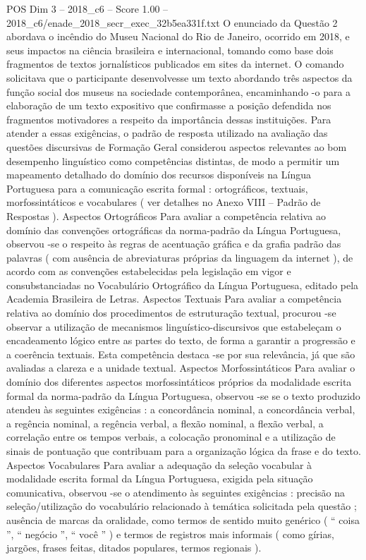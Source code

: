 \begin{textsample}{POS Dim 3 – 2018\_c6 – Score 1.00 – 2018\_c6/enade\_2018\_secr\_exec\_32b5ea331f.txt}
O enunciado da Questão 2 abordava o incêndio do Museu Nacional do Rio de Janeiro, ocorrido em 2018, e seus impactos na ciência brasileira e internacional, tomando como base dois fragmentos de textos jornalísticos publicados em sites da internet.
O comando solicitava que o participante desenvolvesse um texto abordando três aspectos da função social dos museus na sociedade contemporânea, encaminhando -o para a elaboração de um texto expositivo que confirmasse a posição defendida nos fragmentos motivadores a respeito da importância dessas instituições.
Para atender a essas exigências, o padrão de resposta utilizado na avaliação das questões discursivas de Formação Geral considerou aspectos relevantes ao bom desempenho linguístico como competências distintas, de modo a permitir um mapeamento detalhado do domínio dos recursos disponíveis na Língua Portuguesa para a comunicação escrita formal : ortográficos, textuais, morfossintáticos e vocabulares ( ver detalhes no Anexo VIII – Padrão de Respostas ).
Aspectos Ortográficos Para avaliar a competência relativa ao domínio das convenções ortográficas da norma-padrão da Língua Portuguesa, observou -se o respeito às regras de acentuação gráfica e da grafia padrão das palavras ( com ausência de abreviaturas próprias da linguagem da internet ), de acordo com as convenções estabelecidas pela legislação em vigor e consubstanciadas no Vocabulário Ortográfico da Língua Portuguesa, editado pela Academia Brasileira de Letras.
Aspectos Textuais Para avaliar a competência relativa ao domínio dos procedimentos de estruturação textual, procurou -se observar a utilização de mecanismos linguístico-discursivos que estabeleçam o encadeamento lógico entre as partes do texto, de forma a garantir a progressão e a coerência textuais.
Esta competência destaca -se por sua relevância, já que são avaliadas a clareza e a unidade textual.
Aspectos Morfossintáticos Para avaliar o domínio dos diferentes aspectos morfossintáticos próprios da modalidade escrita formal da norma-padrão da Língua Portuguesa, observou -se se o texto produzido atendeu às seguintes exigências : a concordância nominal, a concordância verbal, a regência nominal, a regência verbal, a flexão nominal, a flexão verbal, a correlação entre os tempos verbais, a colocação pronominal e a utilização de sinais de pontuação que contribuam para a organização lógica da frase e do texto.
Aspectos Vocabulares Para avaliar a adequação da seleção vocabular à modalidade escrita formal da Língua Portuguesa, exigida pela situação comunicativa, observou -se o atendimento às seguintes exigências : precisão na seleção/utilização do vocabulário relacionado à temática solicitada pela questão ; ausência de marcas da oralidade, como termos de sentido muito genérico ( “ coisa ”, “ negócio ”, “ você ” ) e termos de registros mais informais ( como gírias, jargões, frases feitas, ditados populares, termos regionais ).

\end{textsample}
